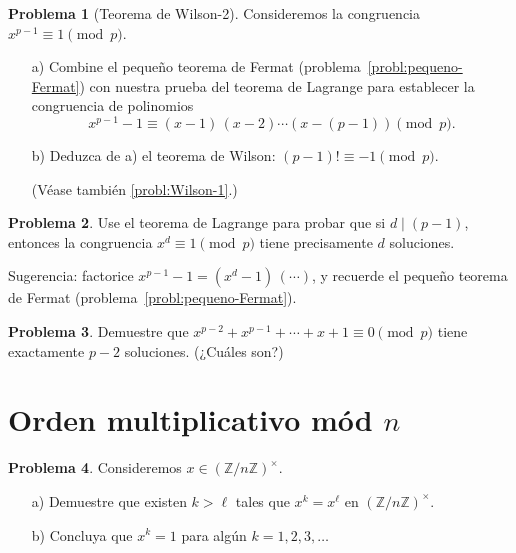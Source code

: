 \documentclass{article}
\newcommand{\ZZ}{\mathbb{Z}}
\theoremstyle{definition}
\newtheorem{problema}{Problema}[section]
\begin{document}
\begin{problema}[Teorema de Wilson-2]
  \label{probl:Wilson-2}
  Consideremos la congruencia $x^{p-1} \equiv 1 \pmod{p}$.

  \begin{enumerate}
  \item[a)] Combine el pequeño teorema de Fermat
    (problema~\ref{probl:pequeno-Fermat}) con nuestra prueba del teorema de
    Lagrange para establecer la congruencia de polinomios
    $$x^{p-1} - 1 \equiv (x - 1)\,(x - 2)\cdots (x - (p-1)) \pmod{p}.$$

  \item[b)] Deduzca de a) el teorema de Wilson:
    $(p - 1)! \equiv -1 \pmod{p}$.

  (Véase también \ref{probl:Wilson-1}.)
  \end{enumerate}
\end{problema}

\begin{problema}
  Use el teorema de Lagrange para probar que si $d \mid (p-1)$, entonces la
  congruencia $x^d \equiv 1 \pmod{p}$ tiene precisamente $d$ soluciones.

  Sugerencia: factorice $x^{p-1} - 1 = (x^d - 1)\,(\cdots)$, y recuerde
  el pequeño teorema de Fermat (problema~\ref{probl:pequeno-Fermat}).
\end{problema}

\begin{problema}
  Demuestre que $x^{p-2} + x^{p-1} + \cdots + x + 1 \equiv 0 \pmod{p}$
  tiene exactamente $p-2$ soluciones. (¿Cuáles son?)
\end{problema}


\section{Orden multiplicativo mód $n$}

\begin{problema}
  Consideremos $x \in (\ZZ/n\ZZ)^\times$.

  \begin{enumerate}
  \item[a)] Demuestre que existen $k > \ell$ tales que $x^k = x^\ell$ en
    $(\ZZ/n\ZZ)^\times$.

  \item[b)] Concluya que $x^k = 1$ para algún $k = 1,2,3,\ldots$
  \end{enumerate}
\end{problema}
\end{document}
